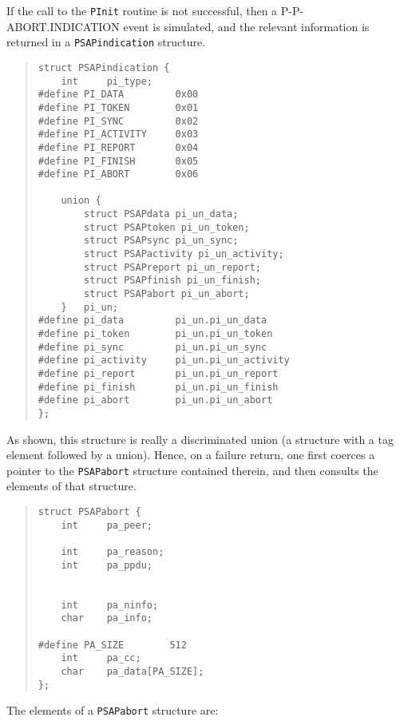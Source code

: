 If the call to the \verb"PInit" routine is not successful,
then a {\sf P-P-ABORT.IN\-DI\-CA\-TION\/} event is simulated,
and the relevant information is returned in a \verb"PSAPindication"
structure.\label{PSAPindication}
\begin{quote}\small\begin{verbatim}
struct PSAPindication {
    int     pi_type;
#define PI_DATA         0x00
#define PI_TOKEN        0x01
#define PI_SYNC         0x02
#define PI_ACTIVITY     0x03
#define PI_REPORT       0x04
#define PI_FINISH       0x05
#define PI_ABORT        0x06

    union {
        struct PSAPdata pi_un_data;
        struct PSAPtoken pi_un_token;
        struct PSAPsync pi_un_sync;
        struct PSAPactivity pi_un_activity;
        struct PSAPreport pi_un_report;
        struct PSAPfinish pi_un_finish;
        struct PSAPabort pi_un_abort;
    }   pi_un;
#define pi_data         pi_un.pi_un_data
#define pi_token        pi_un.pi_un_token
#define pi_sync         pi_un.pi_un_sync
#define pi_activity     pi_un.pi_un_activity
#define pi_report       pi_un.pi_un_report
#define pi_finish       pi_un.pi_un_finish
#define pi_abort        pi_un.pi_un_abort
};
\end{verbatim}\end{quote}
As shown, this structure is really a discriminated union
(a structure with a tag element followed by a union).
Hence, on a failure return,
one first coerces a pointer to the \verb"PSAPabort" structure contained
therein,
and then consults the elements of that structure.
\begin{quote}\small\begin{verbatim}
struct PSAPabort {
    int     pa_peer;

    int     pa_reason;
    int     pa_ppdu;


    int     pa_ninfo;
    char    pa_info;

#define PA_SIZE        512
    int     pa_cc;
    char    pa_data[PA_SIZE];
};
\end{verbatim}\end{quote}
The elements of a \verb"PSAPabort" structure are:
